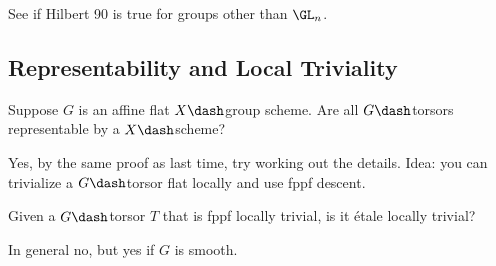 \begin{exercise}[?]

See if Hilbert 90 is true for groups other than \(\GL_n\).

\end{exercise}

\hypertarget{representability-and-local-triviality}{%
\subsection{Representability and Local
Triviality}\label{representability-and-local-triviality}}

\begin{question}

Suppose \(G\) is an affine flat \(X\dash\)group scheme. Are all
\(G\dash\)torsors representable by a \(X\dash\)scheme?

\end{question}

\begin{answer}

Yes, by the same proof as last time, try working out the details. Idea:
you can trivialize a \(G\dash\)torsor flat locally and use fppf descent.

\end{answer}

\begin{question}

Given a \(G\dash\)torsor \(T\) that is fppf locally trivial, is it étale
locally trivial?

\end{question}

\begin{answer}

In general no, but yes if \(G\) is smooth.

\end{answer}

